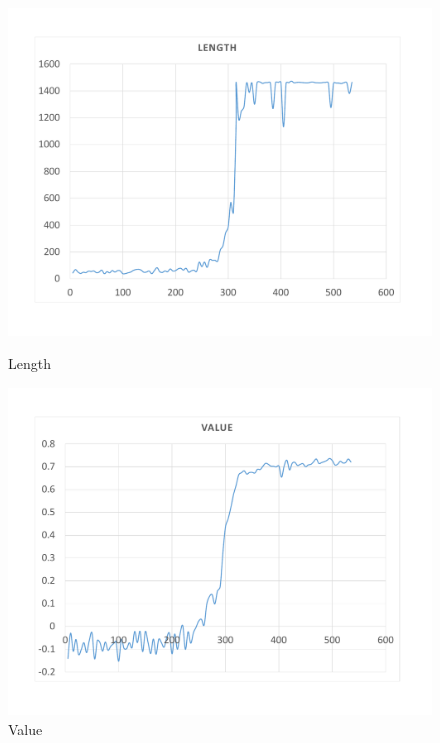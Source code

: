 \begin{figure}[H]
	\includegraphics[width=\linewidth]{Figures/Length}
	\caption{Length}\label{fig:Length}
	\endminipage\hfill
	\includegraphics[width=\textwidth]{Figures/Value}
	\caption{Value}
	\label{fig:Value}
	\endminipage
\end{figure}
